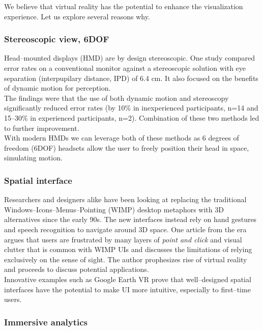 \documentclass{article}
\begin{document}
We believe that virtual reality has the potential to enhance the visualization experience. Let us explore several reasons why.

\subsubsection{Stereoscopic view, 6DOF}

Head--mounted displays (HMD) are by design stereoscopic. One study compared error rates on a conventional monitor against a stereoscopic solution with eye separation (interpupilary distance, IPD) of 6.4 cm. It also focused on the benefits of dynamic motion for perception.\\

The findings were that the use of both dynamic motion and stereoscopy significantly reduced error rates (by 10\% in inexperienced participants, n=14 and 15--30\% in experienced participants, n=2). Combination of these two methods led to further improvement.\cite{ware}\\

With modern HMDs we can leverage both of these methods as 6 degrees of freedom (6DOF) headsets allow the user to freely position their head in space, simulating motion.

\subsubsection{Spatial interface}

Researchers and designers alike have been looking at replacing the traditional Windows--Icons--Menus--Pointing (WIMP) desktop metaphors with 3D alternatives since the early 90s. The new interfaces instead rely on hand gestures and speech recognition to navigate around 3D space. One article from the era argues that users are frustrated by many layers of \emph{point and click} and visual clutter that is common with WIMP UIs and discusses the limitations of relying exclusively on the sense of sight. The author prophesizes rise of virtual reality and proceeds to discuss potential applications.\cite{wimp}\\

Innovative examples such as Google Earth VR prove that well--designed spatial interfaces have the potential to make UI more intuitive, especially to first--time users.\cite{earthux}

\subsubsection{Immersive analytics}
\end{document}
